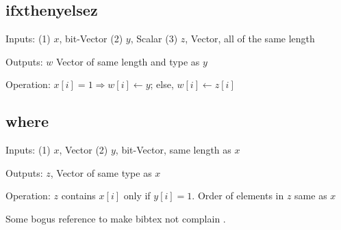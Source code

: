 \ei

\subsection{ifxthenyelsez}
\bi
\item Inputs: (1) \(x\), bit-Vector (2) \(y\), Scalar (3) \(z\), Vector, all of
the same length

\item Outputs: \(w\) Vector of same length and type as \(y\)

\item Operation: \(x[i] = 1 \Rightarrow w[i] \leftarrow y\); else, \(w[i]
\leftarrow z[i]\)

\ei


\subsection{where}
\bi
\item Inputs: (1) \(x\), Vector  (2) \(y\), bit-Vector, same length as \(x\)

\item Outputs: \(z\), Vector of same type as \(x\)

\item Operation: \(z\) contains \(x[i]\) only if
\(y[i] = 1\). Order of elements in  \(z\) same as \(x\)

\ei

\appendix
Some bogus reference to make bibtex not complain \cite{Hastie2009}.


